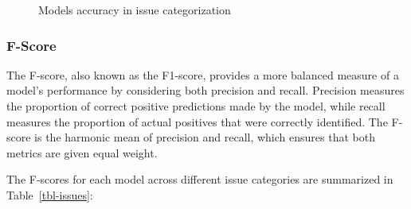 \documentclass[
  authoryear,
  preprint,
  3p]{elsarticle}
\begin{document}
\begin{figure}


\caption{\label{fig-accuracy}Models accuracy in issue categorization}

\end{figure}%

\subsubsection{F-Score}\label{f-score}

The F-score, also known as the F1-score, provides a more balanced
measure of a model's performance by considering both precision and
recall. Precision measures the proportion of correct positive
predictions made by the model, while recall measures the proportion of
actual positives that were correctly identified. The F-score is the
harmonic mean of precision and recall, which ensures that both metrics
are given equal weight.

The F-scores for each model across different issue categories are
summarized in Table~\ref{tbl-issues}:
\end{document}
